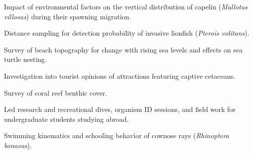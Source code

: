\documentclass[a4paper]{deedy-resume} %
\begin{document}

Impact of environmental factors on the vertical distribution of capelin (\textit{Mallotus villosus}) during their spawning migration.

\sectionspace %



\begin{tightitemize}
\sectionspace  %
\item Distance sampling for detection probability of invasive lionfish (\textit{Pterois volitans}).
\item Survey of beach topography for change with rising sea levels and effects on sea turtle nesting.
\item Investigation into tourist opinions of attractions featuring captive cetaceans.
\item Survey of coral reef benthic cover.
\item Led research and recreational dives, organism ID sessions, and field work for undergraduate students studying abroad.
\end{tightitemize}

\sectionspace %



Swimming kinematics and schooling behavior of cownose rays (\textit{Rhinoptera bonasus}).

\sectionspace %


\end{document}
